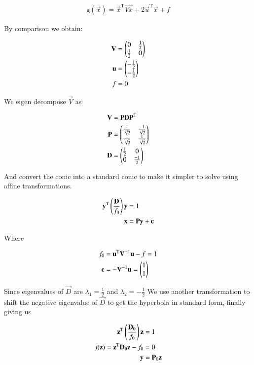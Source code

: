 \documentclass[journal]{IEEEtran}
\begin{document}
\begin{align}
	\text{g}(\vec{x}) = \vec{x}^\text{T}\vec{Vx} + 2\vec{u}^\text{T}\vec{x} + f \label{actual_conic}
\end{align}

By comparison we obtain:

\begin{align}
	\mathbf{V} &= \begin{pmatrix}0 & \frac{1}{2} \\ \frac{1}{2} & 0\end{pmatrix}\\
	\mathbf{u} &= \begin{pmatrix}-\frac{1}{2} \\ -\frac{1}{2}\end{pmatrix}\\
	f &= 0
\end{align}

We eigen decompose $\vec{V}$ as 

\begin{align}
	\mathbf{V} &= \mathbf{PDP}^\text{T}\\
	\mathbf{P} &= \begin{pmatrix}\frac{1}{\sqrt{2}} & \frac{-1}{\sqrt{2}} \\ \frac{1}{\sqrt{2}} & \frac{1}{\sqrt{2}}\end{pmatrix}\\
	\mathbf{D} &= \begin{pmatrix}\frac{1}{2} & 0 \\ 0 & \frac{-1}{2}\end{pmatrix}
\end{align}

And convert the conic into a standard conic to make it simpler to solve using affine transformations.

\begin{align}
	\mathbf{y}^\text{T}\left(\frac{\mathbf{D}}{f_0}\right)\mathbf{y} &= 1\\
	\mathbf{x} &= \mathbf{Py} + \mathbf{c} \label{t1}\\
\end{align}

Where 

\begin{align}
	f_0 &= \mathbf{u}^\text{T}\mathbf{V}^{-1}\mathbf{u} - f = 1\\
	\mathbf{c} &= -\mathbf{V}^{-1}\mathbf{u} = \begin{pmatrix}1 \\ 1\end{pmatrix}
\end{align}

Since eigenvalues of $\vec{D}$ are $\lambda_1 = \frac{1}{2}$ and $\lambda_2=-\frac{1}{2}$ We use another transformation to shift the negative eigenvalue of $\vec{D}$ to get the hyperbola in standard form, finally giving us

\begin{align}
	\mathbf{z}^\text{T}\left(\frac{\mathbf{D_0}}{f_0}\right)\mathbf{z} &= 1\\
	j(\mathbf{z}) = \mathbf{z}^\text{T}\mathbf{D_0}\mathbf{z} - f_0 &= 0  \label{standard_conic}\\
	\mathbf{y} &= \mathbf{P}_0\mathbf{z} \label{t2}\\
\end{align}
\end{document}
